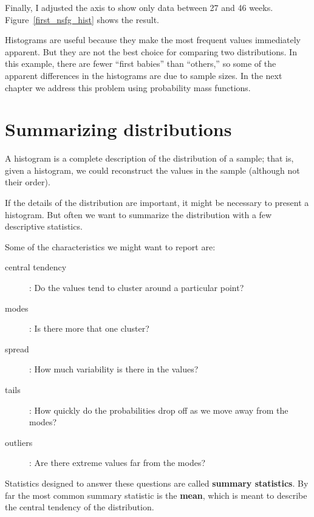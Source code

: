 \documentclass[12pt]{book}
\begin{document}
Finally, I adjusted the axis to show only data between 27 and 46 weeks.
Figure~\ref{first_nsfg_hist} shows the result.

Histograms are useful because they make the most frequent values
immediately apparent.  But they are not the best choice for comparing
two distributions.  In this example, there are fewer ``first babies''
than ``others,'' so some of the apparent differences in the histograms
are due to sample sizes.  In the next chapter we address this problem
using probability mass functions.


\section{Summarizing distributions}
\label{mean}

A histogram is a complete description of the distribution of a sample;
that is, given a histogram, we could reconstruct the values in the
sample (although not their order).

If the details of the distribution are important, it might be
necessary to present a histogram.  But often we want to
summarize the distribution with a few descriptive statistics.

Some of the characteristics we might want to report are:

\begin{description}

\item[central tendency]: Do the values tend to cluster around
a particular point?

\item[modes]: Is there more that one cluster?

\item[spread]: How much variability is there in the values?

\item[tails]: How quickly do the probabilities drop off as we
move away from the modes?

\item[outliers]: Are there extreme values far from the modes?

\end{description}

Statistics designed to answer these questions are called {\bf summary
  statistics}.  By far the most common summary statistic is the {\bf
  mean}, which is meant to describe the central tendency of the
distribution.    
\end{document}
